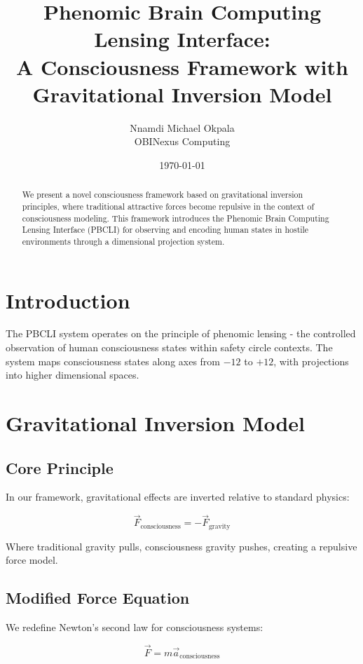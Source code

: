 \documentclass{article}
\title{Phenomic Brain Computing Lensing Interface:\\
A Consciousness Framework with Gravitational Inversion Model}
\author{Nnamdi Michael Okpala\\OBINexus Computing}
\date{\today}
\begin{document}
\maketitle

\begin{abstract}
We present a novel consciousness framework based on gravitational inversion principles, where traditional attractive forces become repulsive in the context of consciousness modeling. This framework introduces the Phenomic Brain Computing Lensing Interface (PBCLI) for observing and encoding human states in hostile environments through a dimensional projection system.
\end{abstract}

\section{Introduction}

The PBCLI system operates on the principle of phenomic lensing - the controlled observation of human consciousness states within safety circle contexts. The system maps consciousness states along axes from $-12$ to $+12$, with projections into higher dimensional spaces.

\section{Gravitational Inversion Model}

\subsection{Core Principle}

In our framework, gravitational effects are inverted relative to standard physics:

\begin{equation}
\vec{F}_{\text{consciousness}} = -\vec{F}_{\text{gravity}}
\end{equation}

Where traditional gravity pulls, consciousness gravity pushes, creating a repulsive force model.

\subsection{Modified Force Equation}

We redefine Newton's second law for consciousness systems:

\begin{equation}
\vec{F} = m \vec{a}_{\text{consciousness}}
\end{equation}
\end{document}
